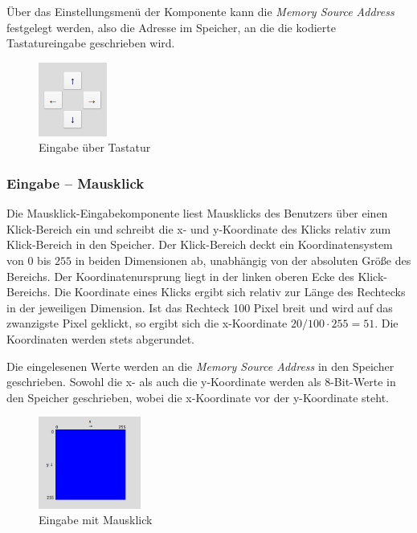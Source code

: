 Über das Einstellungsmenü der Komponente kann die \textit{Memory Source Address}
festgelegt werden, also die Adresse im Speicher, an die die kodierte
Tastatureingabe geschrieben wird.

\begin{figure}[ht]
	\centering
	\includegraphics[width=0.2\textwidth]{Images/Joystick}
	\caption{Eingabe über Tastatur}
	\label{Joystick}
\end{figure}


\subsubsection{Eingabe -- Mausklick}
Die Mausklick-Eingabekomponente liest Mausklicks des Benutzers über einen
Klick-Bereich ein und schreibt die x- und y-Koordinate des Klicks relativ zum
Klick-Bereich in den Speicher. Der Klick-Bereich deckt ein Koordinatensystem von
$0$ bis $255$ in beiden Dimensionen ab, unabhängig von der absoluten Größe des
Bereichs. Der Koordinatenursprung liegt in der linken oberen Ecke des
Klick-Bereichs. Die Koordinate eines Klicks ergibt sich relativ zur Länge des
Rechtecks in der jeweiligen Dimension. Ist das Rechteck 100 Pixel breit und wird
auf das zwanzigste Pixel geklickt, so ergibt sich die x-Koordinate $20 / 100
\cdot 255 = 51$. Die Koordinaten werden stets abgerundet.

Die eingelesenen Werte werden an die \textit{Memory Source Address} in
den Speicher geschrieben. Sowohl die x- als auch die y-Koordinate werden als
8-Bit-Werte in den Speicher geschrieben, wobei die x-Koordinate vor der
y-Koordinate steht.

\begin{figure}[ht]
	\centering
	\includegraphics[width=0.3\textwidth]{Images/MouseArea}
	\caption{Eingabe mit Mausklick}
	\label{MouseArea}
\end{figure}

